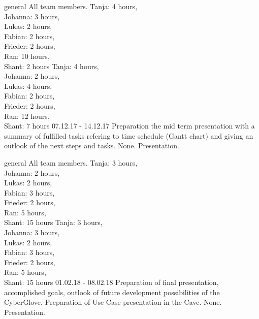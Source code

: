 	{general}%
	{All team members.}%
	{Tanja: 4 hours, \\
	Johanna: 3 hours, \\
	Lukas: 2 hours, \\
	Fabian:  2 hours, \\
	Frieder: 2 hours,\\
	Ran: 10 hours,\\
	Shant: 2 hours}%
	{Tanja: 4 hours,\\ 
	Johanna: 2 hours,\\
	Lukas: 4 hours,\\
	Fabian: 2 hours,\\
	Frieder: 2 hours,\\
	Ran: 12 hours,\\
	Shant: 7 hours}%
	{07.12.17 - 14.12.17}%
	{Preparation the mid term presentation with a summary of fulfilled tasks refering to time schedule (Gantt chart) and giving an outlook of the next steps and tasks.}%
	{None.}%
	{Presentation.}%
	
	{general}%
	{All team members.}%
	{Tanja: 3 hours, \\
	Johanna: 2 hours,\\
	Lukas: 2 hours,\\
	Fabian: 3 hours,\\
	Frieder: 2 hours,\\
	Ran: 5 hours,\\
	Shant: 15 hours}%
	{Tanja: 3 hours,\\ 
	Johanna: 3 hours,\\
	Lukas: 2 hours,\\
	Fabian: 3 hours,\\
	Frieder: 2 hours,\\
	Ran: 5 hours,\\
	Shant: 15 hours}%
	{01.02.18 - 08.02.18}%
	{Preparation of final presentation, accomplished goals, outlook of future development possibilities of the CyberGlove. Preparation of Use Case presentation in the Cave.}%
	{None.}%
	{Presentation.}%

